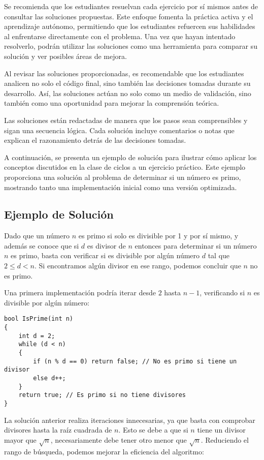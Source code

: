 \documentclass{article}
\begin{document}
Se recomienda que los estudiantes resuelvan cada ejercicio por sí mismos antes de consultar las soluciones propuestas. Este enfoque fomenta la práctica activa y el aprendizaje autónomo, permitiendo que los estudiantes refuercen sus habilidades al enfrentarse directamente con el problema. Una vez que hayan intentado resolverlo, podrán utilizar las soluciones como una herramienta para comparar su solución y ver posibles áreas de mejora.

Al revisar las soluciones proporcionadas, es recomendable que los estudiantes analicen no solo el código final, sino también las decisiones tomadas durante su desarrollo. Así, las soluciones actúan no solo como un medio de validación, sino también como una oportunidad para mejorar la comprensión teórica.

Las soluciones están redactadas de manera que los pasos sean comprensibles y sigan una secuencia lógica. Cada solución incluye comentarios o notas que explican el razonamiento detrás de las decisiones tomadas.

A continuación, se presenta un ejemplo de solución para ilustrar cómo aplicar los conceptos discutidos en la clase de ciclos a un ejercicio práctico. Este ejemplo proporciona una solución al problema de determinar si un número es primo, mostrando tanto una implementación inicial como una versión optimizada.

\subsection*{Ejemplo de Solución}

Dado que un número \(n\) es primo si solo es divisible por 1 y por sí mismo, y además se conoce que si \(d\) es divisor de \(n\) entonces para determinar si un número \(n\) es primo, basta con verificar si es divisible por algún número \(d\) tal que \(2 \leq d < n\). Si encontramos algún divisor en ese rango, podemos concluir que \(n\) no es primo.

Una primera implementación podría iterar desde \(2\) hasta \(n - 1\), verificando si \(n\) es divisible por algún número:

\begin{lstlisting}
bool IsPrime(int n)
{
    int d = 2;
    while (d < n)
    {
        if (n % d == 0) return false; // No es primo si tiene un divisor
        else d++;
    }
    return true; // Es primo si no tiene divisores
}
\end{lstlisting}

La solución anterior realiza iteraciones innecesarias, ya que basta con comprobar divisores hasta la raíz cuadrada de \(n\). Esto se debe a que si \(n\) tiene un divisor mayor que \(\sqrt{n}\), necesariamente debe tener otro menor que \(\sqrt{n}\). Reduciendo el rango de búsqueda, podemos mejorar la eficiencia del algoritmo:
\end{document}
